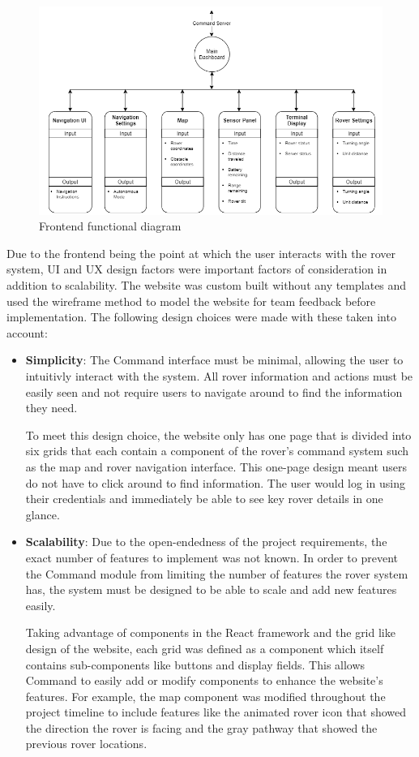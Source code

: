 \documentclass[11pt, a4paper]{article}
\begin{document}
\begin{figure} [h!]
    \centering
    \includegraphics[scale=0.5]{Command_Frontend.png}
    \caption{Frontend functional diagram }
\end{figure}

Due to the frontend being the point at which the user interacts with the rover system, UI and UX design factors were important factors of consideration in addition to scalability. The website was custom built without any templates and used the wireframe method to model the website for team feedback before implementation. The following design choices were made with these taken into account:
\begin{itemize}
    \item \textbf{Simplicity}: The Command interface must be minimal, allowing the user to intuitivly interact with the system. All rover information and actions must be easily seen and not require users to navigate around to find the information they need.
    
    To meet this design choice, the website only has one page that is divided into six grids that each contain a component of the rover's command system such as the map and rover navigation interface. This one-page design meant users do not have to click around to find information. The user would log in using their credentials and immediately be able to see key rover details in one glance.

    \item \textbf{Scalability}: Due to the open-endedness of the project requirements, the exact number of features to implement was not known. In order to prevent the Command module from limiting the number of features the rover system has, the system must be designed to be able to scale and add new features easily. 
    
    Taking advantage of components in the React framework and the grid like design of the website, each grid was defined as a component which itself contains sub-components like buttons and display fields. This allows Command to easily add or modify components to enhance the website's features. For example, the map component was modified throughout the project timeline to include features like the animated rover icon that showed the direction the rover is facing and the gray pathway that showed the previous rover locations.  
    
\end{itemize}
\end{document}
